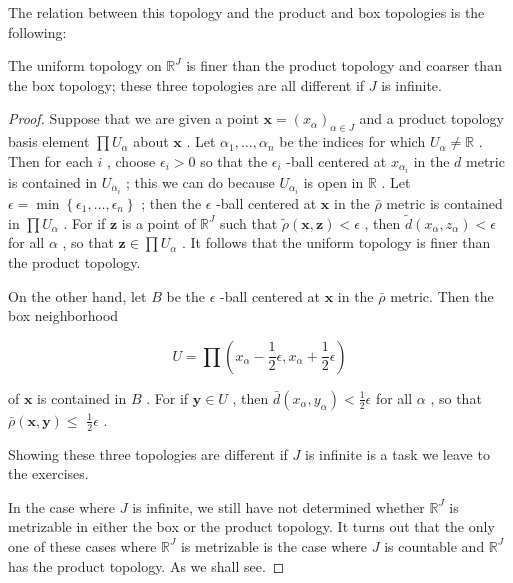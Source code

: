 The relation between this topology and the product and box topologies is the following:

\begin{theorem} The uniform topology on \({\mathbb{R}}^{J}\) is finer than the product topology and coarser than the box topology; these three topologies are all different if \(J\) is infinite.

\end{theorem}
\begin{proof}
Suppose that we are given a point \(\mathbf{x} = {\left( {x}_{\alpha }\right) }_{\alpha  \in  J}\) and a product topology basis element \(\prod {U}_{\alpha }\) about \(\mathbf{x}\) . Let \({\alpha }_{1},\ldots ,{\alpha }_{n}\) be the indices for which \({U}_{\alpha } \neq  \mathbb{R}\) . Then for each \(i\) , choose \({\epsilon }_{i} > 0\) so that the \({\epsilon }_{i}\) -ball centered at \({x}_{{\alpha }_{i}}\) in the \(d\) metric is contained in \({U}_{{\alpha }_{i}}\) ; this we can do because \({U}_{{\alpha }_{i}}\) is open in \(\mathbb{R}\) . Let \(\epsilon  = \min \left\{  {{\epsilon }_{1},\ldots ,{\epsilon }_{n}}\right\}\) ; then the \(\epsilon\) -ball centered at \(\mathbf{x}\) in the \(\bar{\rho }\) metric is contained in \(\prod {U}_{\alpha }\) . For if \(\mathbf{z}\) is a point of \({\mathbb{R}}^{J}\) such that \(\widetilde{\rho }\left( {\mathbf{x},\mathbf{z}}\right)  < \epsilon\) , then \(\widetilde{d}\left( {{x}_{\alpha },{z}_{\alpha }}\right)  < \epsilon\) for all \(\alpha\) , so that \(\mathbf{z} \in  \prod {U}_{\alpha }\) . It follows that the uniform topology is finer than the product topology.

On the other hand, let \(B\) be the \(\epsilon\) -ball centered at \(\mathbf{x}\) in the \(\bar{\rho }\) metric. Then the box neighborhood

\[
U = \prod \left( {{x}_{\alpha } - \frac{1}{2}\epsilon ,{x}_{\alpha } + \frac{1}{2}\epsilon }\right)
\]

of \(\mathbf{x}\) is contained in \(B\) . For if \(\mathbf{y} \in  U\) , then \(\bar{d}\left( {{x}_{\alpha },{y}_{\alpha }}\right)  < \frac{1}{2}\epsilon\) for all \(\alpha\) , so that \(\bar{\rho }\left( {\mathbf{x},\mathbf{y}}\right)  \leq\)  \(\frac{1}{2}\epsilon\) .

Showing these three topologies are different if \(J\) is infinite is a task we leave to the exercises.

In the case where \(J\) is infinite, we still have not determined whether \({\mathbb{R}}^{J}\) is metrizable in either the box or the product topology. It turns out that the only one of these cases where \({\mathbb{R}}^{J}\) is metrizable is the case where \(J\) is countable and \({\mathbb{R}}^{J}\) has the product topology. As we shall see.
\end{proof}

